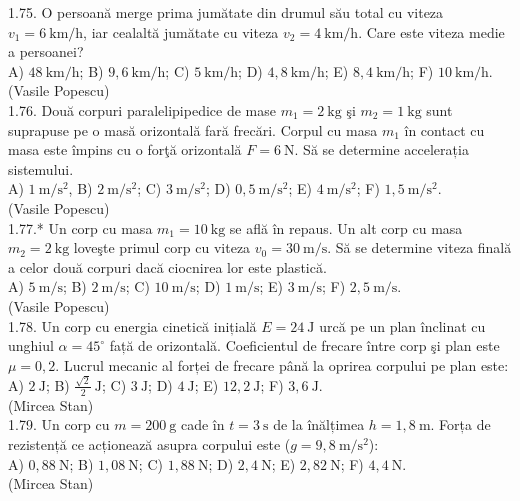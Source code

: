 1.75. O persoană merge prima jumătate din drumul său total cu viteza $v_{1}=6 \mathrm{~km} / \mathrm{h}$, iar cealaltă jumătate cu viteza $v_{2}=4 \mathrm{~km} / \mathrm{h}$. Care este viteza medie a persoanei?\\ A) $48 \mathrm{~km} / \mathrm{h}$; B) $9,6 \mathrm{~km} / \mathrm{h}$; C) $5 \mathrm{~km} / \mathrm{h}$; D) $4,8 \mathrm{~km} / \mathrm{h}$; E) $8,4 \mathrm{~km} / \mathrm{h}$; F) $10 \mathrm{~km} / \mathrm{h}$.\\ (Vasile Popescu)\\

1.76. Două corpuri paralelipipedice de mase $m_{1}=2 \mathrm{~kg}$ şi $m_{2}=1 \mathrm{~kg}$ sunt suprapuse pe o masă orizontală fară frecări. Corpul cu masa $m_{1}$ în contact cu masa este împins cu o forţă orizontală $F=6 \mathrm{~N}$. Să se determine accelerația sistemului.\\ A) $1 \mathrm{~m} / \mathrm{s}^{2}$, B) $2 \mathrm{~m} / \mathrm{s}^{2}$; C) $3 \mathrm{~m} / \mathrm{s}^{2}$; D) $0,5 \mathrm{~m} / \mathrm{s}^{2}$; E) $4 \mathrm{~m} / \mathrm{s}^{2}$; F) $1,5 \mathrm{~m} / \mathrm{s}^{2}$.\\ (Vasile Popescu)\\

1.77.* Un corp cu masa $m_{1}=10 \mathrm{~kg}$ se află în repaus. Un alt corp cu masa $m_{2}=2 \mathrm{~kg}$ loveşte primul corp cu viteza $v_{0}=30 \mathrm{~m} / \mathrm{s}$. Să se determine viteza finală a celor două corpuri dacă ciocnirea lor este plastică.\\ A) $5 \mathrm{~m} / \mathrm{s}$; B) $2 \mathrm{~m} / \mathrm{s}$; C) $10 \mathrm{~m} / \mathrm{s}$; D) $1 \mathrm{~m} / \mathrm{s}$; E) $3 \mathrm{~m} / \mathrm{s}$; F) $2,5 \mathrm{~m} / \mathrm{s}$.\\ (Vasile Popescu)\\

1.78. Un corp cu energia cinetică inițială $E=24 \mathrm{~J}$ urcă pe un plan înclinat cu unghiul $\alpha=45^{\circ}$ față de orizontală. Coeficientul de frecare între corp şi plan este $\mu=0,2$. Lucrul mecanic al forței de frecare până la oprirea corpului pe plan este:\\ A) $2 \mathrm{~J}$; B) $\frac{\sqrt{2}}{2} \mathrm{~J}$; C) $3 \mathrm{~J}$; D) $4 \mathrm{~J}$; E) $12,2 \mathrm{~J}$; F) $3,6 \mathrm{~J}$.\\ (Mircea Stan)\\

1.79. Un corp cu $m=200 \mathrm{~g}$ cade în $t=3 \mathrm{~s}$ de la înălțimea $h=1,8 \mathrm{~m}$. Forța de rezistență ce acționează asupra corpului este ($g=9,8 \mathrm{~m} / \mathrm{s}^{2}$):\\ A) $0,88 \mathrm{~N}$; B) $1,08 \mathrm{~N}$; C) $1,88 \mathrm{~N}$; D) $2,4 \mathrm{~N}$; E) $2,82 \mathrm{~N}$; F) $4,4 \mathrm{~N}$.\\ (Mircea Stan)\\

